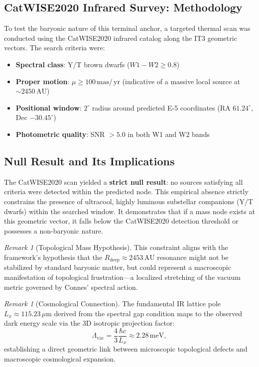 \documentclass[11pt,a4paper]{article}
\theoremstyle{remark}
\newtheorem{remark}[theorem]{Remark}
\newcommand{\AU}{\,\mathrm{AU}}
\newcommand{\mas}{\,\mathrm{mas}}
\newcommand{\yr}{\,\mathrm{yr}}
\begin{document}
\subsection{CatWISE2020 Infrared Survey: Methodology}

To test the baryonic nature of this terminal anchor, a targeted thermal scan was conducted using the CatWISE2020 infrared catalog \cite{catwise2020} along the IT3 geometric vectors. The search criteria were:
\begin{itemize}[leftmargin=2em]
    \item \textbf{Spectral class}: Y/T brown dwarfs ($W1-W2 \ge 0.8$)
    \item \textbf{Proper motion}: $\mu \ge 100\mas/\yr$ (indicative of a massive local source at $\sim 2450\AU$)
    \item \textbf{Positional window}: $2^\circ$ radius around predicted E-5 coordinates (RA $61.24^\circ$, Dec $-30.45^\circ$)
    \item \textbf{Photometric quality}: SNR $> 5.0$ in both W1 and W2 bands
\end{itemize}

\subsection{Null Result and Its Implications}

The CatWISE2020 scan yielded a \textbf{strict null result}: no sources satisfying all criteria were detected within the predicted node. This empirical absence strictly constrains the presence of ultracool, highly luminous substellar companions (Y/T dwarfs) within the searched window. It demonstrates that if a mass node exists at this geometric vector, it falls below the CatWISE2020 detection threshold or possesses a non-baryonic nature.

\begin{remark}[Topological Mass Hypothesis]
This constraint aligns with the framework's hypothesis that the $R_{\text{deep}} \approx 2453\AU$ resonance might not be stabilized by standard baryonic matter, but could represent a macroscopic manifestation of topological frustration—a localized stretching of the vacuum metric governed by Connes' spectral action.
\end{remark}

\begin{remark}[Cosmological Connection]
\label{rem:dark_energy}
The fundamental IR lattice pole $L_x \approx 115.23\,\mu\text{m}$ derived from the spectral gap condition \cite{logvinovich2026} maps to the observed dark energy scale via the 3D isotropic projection factor:
\begin{equation}
    \Lambda_{\text{vac}} = \frac{4}{3}\frac{\hbar c}{L_x} \approx 2.28\,\text{meV},
\end{equation}
establishing a direct geometric link between microscopic topological defects and macroscopic cosmological expansion.
\end{remark}
\end{document}

